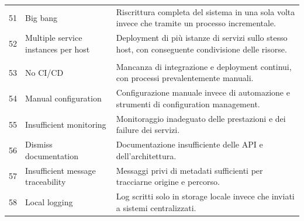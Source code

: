 \begin{table}[H]
\begin{tabularx}{\textwidth}{
>{\centering\arraybackslash}p{0.8cm}
>{\RaggedRight\arraybackslash}p{3.8cm}
>{\RaggedRight\arraybackslash}X
}
\addlinespace[0.3em]

51 & Big bang
& Riscrittura completa del sistema in una sola volta invece che tramite un processo incrementale. \\

\addlinespace[0.3em]

52 & Multiple service instances per host
& Deployment di più istanze di servizi sullo stesso host, con conseguente condivisione delle risorse. \\

\addlinespace[0.6em]

\multicolumn{3}{l}{\textit{Operation}} \\
\cmidrule(lr){1-3}

53 & No CI/CD
& Mancanza di integrazione e deployment continui, con processi prevalentemente manuali. \\

\addlinespace[0.3em]

54 & Manual configuration
& Configurazione manuale invece di automazione e strumenti di configuration management. \\

\addlinespace[0.3em]

55 & Insufficient monitoring
& Monitoraggio inadeguato delle prestazioni e dei failure dei servizi. \\

\addlinespace[0.3em]

56 & Dismiss documentation
& Documentazione insufficiente delle API e dell’architettura. \\

\addlinespace[0.3em]

57 & Insufficient message traceability
& Messaggi privi di metadati sufficienti per tracciarne origine e percorso. \\

\addlinespace[0.3em]

58 & Local logging
& Log scritti solo in storage locale invece che inviati a sistemi centralizzati. \\

\bottomrule
\end{tabularx}
\end{table}
\normalsize